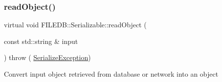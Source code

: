 \mbox{\label{classFILEDB_1_1Serializable_a21a5831fa4f65790490a8a5eba9fcab2}} 
\subsubsection{\texorpdfstring{readObject()}{readObject()}\hspace{0.1cm}{\footnotesize\ttfamily [3/3]}}
{\footnotesize\ttfamily virtual void F\+I\+L\+E\+D\+B\+::\+Serializable\+::read\+Object (\begin{DoxyParamCaption}\item[{const std\+::string \&}]{input }\end{DoxyParamCaption}) throw ( \mbox{\hyperlink{classFILEDB_1_1SerializeException}{Serialize\+Exception}}) \hspace{0.3cm}{\ttfamily [pure virtual]}}

Convert input object retrieved from database or network into an object 

